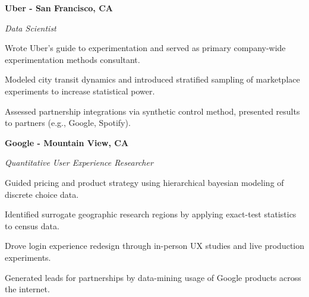 \documentclass{res}
\begin{document}
{\begin{resume}
\begin{minipage}{7.6in}
\vspace{3mm}
\textbf{Uber - San Francisco, CA}

\vspace{0.75mm}
{\it Data Scientist}
\vspace{0.5mm}
\begin{list}{}{\leftmargin=1em}\itemsep-2pt
\item Wrote Uber's guide to experimentation and served as primary company-wide experimentation methods consultant.
\item Modeled city transit dynamics and introduced stratified sampling of marketplace experiments to increase statistical power.
\item Assessed partnership integrations via synthetic control method, presented results to partners (e.g., Google, Spotify).
\end{list}

\vspace{3mm}
\textbf{Google - Mountain View, CA} 

\vspace{0.75mm}
{\it Quantitative User Experience Researcher}  
\vspace{0.5mm}
\begin{list}{}{\leftmargin=1em}\itemsep-2pt
\item Guided pricing and product strategy using hierarchical bayesian modeling of discrete choice data.%
\item Identified surrogate geographic research regions by applying exact-test statistics to census data.%
\item Drove login experience redesign through in-person UX studies and live production experiments.%
\item Generated leads for partnerships by data-mining usage of Google products across the internet.
\end{list}



\end{minipage}
\end{resume}}
\end{document}
